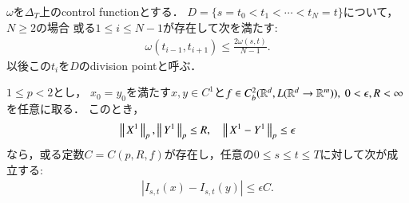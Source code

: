 	\begin{screen}
		\begin{lem}\label{lem:control_function_min}
			$\omega$を$\Delta_T$上のcontrol functionとする．
			$D = \{s = t_0 < t_1 < \cdots < t_N= t\}$について，$N \geq 2$の場合
			或る$1 \leq i \leq N-1$が存在して次を満たす:
			\begin{align}
				\omega(t_{i-1},t_{i+1})
				\leq \frac{2 \omega(s,t)}{N-1}.
			\end{align}
			以後この$t_i$を$D$のdivision pointと呼ぶ．
		\end{lem}
	\end{screen}
	
	\begin{prf}
		\QED
	\end{prf}
	
	\begin{screen}
		\begin{thm}\label{thm:continuity_theorem_1}
			$1 \leq p < 2$とし，
			$x_0 = y_0$を満たす$x,y \in C^1$と$f \in C^2_b(\mathbb{R}^d,L(\mathbb{R}^d \rightarrow \mathbb{R}^m)),\ 0 < \epsilon, R < \infty$を任意に取る．
			このとき，
			\begin{align}
				\left\|\, X^1\, \right\|_{p},\left\|\, Y^1\, \right\|_{p} \leq R,
				\quad \left\|\, X^1 - Y^1\, \right\|_{p} \leq \epsilon
			\end{align}
			なら，或る定数$C = C(p,R,f)$が存在し，任意の$0 \leq s \leq t \leq T$に対して次が成立する:
			\begin{align}
				\left| I_{s,t}(x) - I_{s,t}(y) \right| \leq \epsilon C.
			\end{align}
		\end{thm}
	\end{screen}
	
